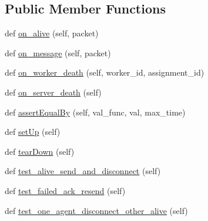 \subsection*{Public Member Functions}
\begin{DoxyCompactItemize}
\item 
def \hyperlink{classparlai_1_1mturk_1_1core_1_1legacy__2018_1_1test_1_1test__socket__manager_1_1TestSocketManagerMessageHandling_a5b3e5dac4b73d2436472f55c145d372d}{on\+\_\+alive} (self, packet)
\item 
def \hyperlink{classparlai_1_1mturk_1_1core_1_1legacy__2018_1_1test_1_1test__socket__manager_1_1TestSocketManagerMessageHandling_a31eb69dbefea43205de51f08999764eb}{on\+\_\+message} (self, packet)
\item 
def \hyperlink{classparlai_1_1mturk_1_1core_1_1legacy__2018_1_1test_1_1test__socket__manager_1_1TestSocketManagerMessageHandling_aec6e2d6e861c3fd5ca421f4c74634655}{on\+\_\+worker\+\_\+death} (self, worker\+\_\+id, assignment\+\_\+id)
\item 
def \hyperlink{classparlai_1_1mturk_1_1core_1_1legacy__2018_1_1test_1_1test__socket__manager_1_1TestSocketManagerMessageHandling_a13d956e47930a8134a8b433e8f911ff7}{on\+\_\+server\+\_\+death} (self)
\item 
def \hyperlink{classparlai_1_1mturk_1_1core_1_1legacy__2018_1_1test_1_1test__socket__manager_1_1TestSocketManagerMessageHandling_a9db60279442ec057d4c828b1336bda3d}{assert\+Equal\+By} (self, val\+\_\+func, val, max\+\_\+time)
\item 
def \hyperlink{classparlai_1_1mturk_1_1core_1_1legacy__2018_1_1test_1_1test__socket__manager_1_1TestSocketManagerMessageHandling_a6220977a45ee4f17c3bd0cd0ece4e602}{set\+Up} (self)
\item 
def \hyperlink{classparlai_1_1mturk_1_1core_1_1legacy__2018_1_1test_1_1test__socket__manager_1_1TestSocketManagerMessageHandling_acf7ce56ce7032cc06cc8baf1bd0ae9c8}{tear\+Down} (self)
\item 
def \hyperlink{classparlai_1_1mturk_1_1core_1_1legacy__2018_1_1test_1_1test__socket__manager_1_1TestSocketManagerMessageHandling_afffbc5715410f125b890aeb51c465809}{test\+\_\+alive\+\_\+send\+\_\+and\+\_\+disconnect} (self)
\item 
def \hyperlink{classparlai_1_1mturk_1_1core_1_1legacy__2018_1_1test_1_1test__socket__manager_1_1TestSocketManagerMessageHandling_a601d1c2132f2ea5b1d63235764751147}{test\+\_\+failed\+\_\+ack\+\_\+resend} (self)
\item 
def \hyperlink{classparlai_1_1mturk_1_1core_1_1legacy__2018_1_1test_1_1test__socket__manager_1_1TestSocketManagerMessageHandling_a16565c26c94302fb17793a4b12a871e1}{test\+\_\+one\+\_\+agent\+\_\+disconnect\+\_\+other\+\_\+alive} (self)
\end{DoxyCompactItemize}

